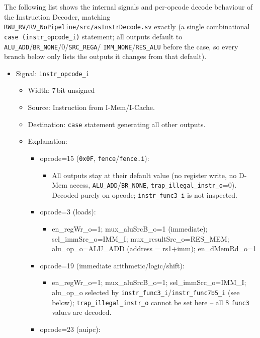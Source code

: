 The following list shows the internal signals and per-opcode decode
behaviour of the Instruction Decoder, matching
\texttt{RWU\_RV/RV\_NoPipeline/src/asInstrDecode.sv} exactly (a single
combinational \texttt{case (instr\_opcode\_i)} statement; all outputs
default to \texttt{ALU\_ADD}/\texttt{BR\_NONE}/0/\texttt{SRC\_REGA}/
\texttt{IMM\_NONE}/\texttt{RES\_ALU} before the case, so every branch below
only lists the outputs it changes from that default).
\begin{itemize}
  \item Signal: \texttt{instr\_opcode\_i}
  \begin{itemize}
    \item Width: 7\,bit unsigned
    \item Source: Instruction from I-Mem/I-Cache.
    \item Destination: \texttt{case} statement generating all other outputs.
    \item Explanation:
    \begin{itemize}
      \item opcode=15 (\texttt{0x0F}, \texttt{fence}/\texttt{fence.i}):
      \begin{itemize}
        \item All outputs stay at their default value (no register write,
          no D-Mem access, \texttt{ALU\_ADD}/\texttt{BR\_NONE},
          \texttt{trap\_illegal\_instr\_o}=0). Decoded purely on opcode;
          \texttt{instr\_func3\_i} is not inspected.
      \end{itemize}
      \item opcode=3 (loads):
      \begin{itemize}
        \item en\_regWr\_o=1; mux\_aluSrcB\_o=1 (immediate); sel\_immSrc\_o=IMM\_I;
          mux\_resultSrc\_o=RES\_MEM; alu\_op\_o=ALU\_ADD (address = rs1+imm);
          en\_dMemRd\_o=1
      \end{itemize}
      \item opcode=19 (immediate arithmetic/logic/shift):
      \begin{itemize}
        \item en\_regWr\_o=1; mux\_aluSrcB\_o=1; sel\_immSrc\_o=IMM\_I;
          alu\_op\_o selected by \texttt{instr\_func3\_i}/\texttt{instr\_func7b5\_i}
          (see below); \texttt{trap\_illegal\_instr\_o} cannot be set here
          -- all 8 \texttt{func3} values are decoded.
      \end{itemize}
      \item opcode=23 (auipc):

\end{itemize}
\end{itemize}
\end{itemize}
